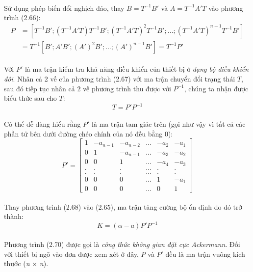 \paragraph{}Sử dụng phép biến đổi nghịch đảo, thay $B = T^{-1}B'$ và $A = T^{-1}A'T$ vào phương trình (2.66):
\begin{align} 
P 
&= [T^{-1}B'; (T^{-1}A'T)T^{-1}B'; (T^{-1}A'T)^{2}T^{-1}B'; ...; (T^{-1}A'T)^{n-1}T^{-1}B']\\
\nonumber
&= T^{-1}[B'; A'B'; (A')^{2}B'; ...; (A')^{n-1}B'] = T^{-1}P'
\end{align}
\paragraph{}Với $P'$ là ma trận kiểm tra khả năng điều khiển của thiết bị ở \textit{dạng bộ điều khiển đôi}. Nhân cả 2 vế của phương trình (2.67) với ma trận chuyển đổi trạng thái $T$, sau đó tiếp tục nhân cả 2 vế phương trình thu được với $P^{-1}$, chúng ta nhận được biểu thức sau cho $T$: 
\begin{equation}
T = P'P^{-1}
\end{equation}
\paragraph{}Có thể dễ dàng hiểu rằng $P'$ là ma trận tam giác trên (gọi như vậy vì tất cả các phần tử bên dưới đường chéo chính của nó đều bằng 0):
\begin{equation}
P' = 
\begin{bmatrix}
1&-a_{n-1}&-a_{n-2}&...&-a_{2}&-a_{1}\\
0&1&-a_{n-1}&...&-a_{3}&-a_{2}\\
0&0&1&...&-a_{4}&-a_{3}\\
.&.&.&...&.&.\\
.&.&.&...&.&.\\
0&0&0&...&1&-a_{1}\\
0&0&0&...&0&1
\end{bmatrix}
\end{equation}
\paragraph{}Thay phương trình (2.68) vào (2.65), ma trận tăng cường bộ ổn định do đó trở thành: 
\begin{equation}
K = (\alpha - a)P'P^{-1}
\end{equation}
\paragraph{}Phương trình (2.70) được gọi là \textit{công thức không gian đặt cực Ackermann}. Đối với thiết bị ngõ vào đơn được xem xét ở đây, $P$ và $P'$ đều là ma trận vuông kích thước (\textit{n} $\times$ \textit{n}). 
